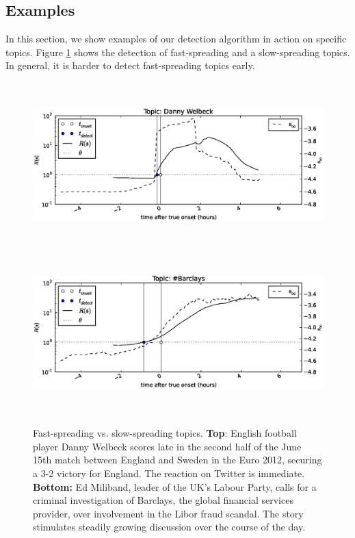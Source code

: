 \clearpage
\subsection{Examples} %
In this section, we show examples of our detection algorithm in action on
specific topics. Figure \ref{fig:examples1} shows the detection of fast-spreading
and a slow-spreading topics. In general, it is harder to detect fast-spreading
topics early.

\begin{figure}[!h]
\begin{center}
\includegraphics[height=2.5in]{../fig/final/detection_examples/danny_welbeck.eps}
\includegraphics[height=2.5in]{../fig/final/detection_examples/barclays.eps}
\end{center}
\caption{\label{fig:examples1} Fast-spreading vs. slow-spreading topics. {\bf
    Top}: English football player Danny Welbeck scores late in the second half
  of the June 15th match between England and Sweden in the Euro 2012, securing a
  3-2 victory for England. The reaction on Twitter is immediate. {\bf Bottom:}
  Ed Miliband, leader of the UK's Labour Party, calls for a criminal
  investigation of Barclays, the global financial services provider, over
  involvement in the Libor fraud scandal. The story stimulates steadily growing
  discussion over the course of the day.}
\end{figure}

